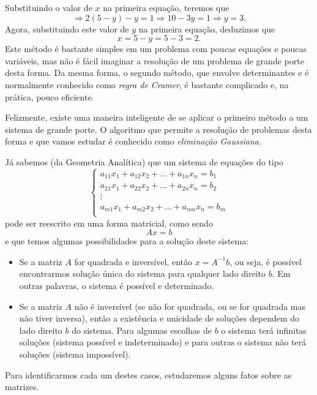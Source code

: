 Substituindo o valor de $x$ na primeira equação, teremos que
\begin{equation*}
    \Rightarrow 2(5-y)-y = 1 \Rightarrow 10 - 3y = 1 \Rightarrow y = 3.
\end{equation*}
Agora, substituindo este valor de $y$ na primeira equação, deduzimos que
\begin{equation*}
    x = 5-y = 5-3 = 2.
\end{equation*}
Este método é bastante simples em um problema com poucas equações e poucas variáveis, mas não é fácil imaginar a resolução de um problema de grande porte desta forma. Da mesma forma, o segundo método, que envolve determinantes e é normalmente conhecido como \emph{regra de Cramer}, é bastante complicado e, na prática, pouco eficiente. 

Felizmente, existe uma maneira inteligente de se aplicar o primeiro método a um sistema de grande porte. O  algoritmo que permite a resolução de problemas desta forma e que vamos estudar é conhecido como \emph{eliminação Gaussiana.}

Já sabemos (da Geometria Analítica) que um sistema de equações do tipo
\begin{equation*}
  \begin{cases}
    a_{11}x_1+a_{12}x_2+\ldots +a_{1n}x_n=b_1\\
    a_{21}x_1+a_{22}x_2+\ldots +a_{2n}x_n=b_2\\
    \vdots\\
    a_{m1}x_1+a_{m2}x_2+\ldots +a_{mn}x_n=b_m\\
  \end{cases}
\end{equation*}
pode ser reescrito em uma forma matricial, como sendo
\begin{equation}
  \label{eq:matricial}
  Ax=b
\end{equation}
e que temos algumas possibilidades para a solução deste sistema:
\begin{itemize}
  \item Se a matriz $A$ for quadrada e inversível, então $x=A^{-1}b$, ou seja, é possível encontrarmos solução única do sistema para qualquer lado direito $b$. Em outras palavras, o sistema é possível e determinado.
  \item Se a matriz $A$ não é inversível (se não for quadrada, ou se for quadrada mas não tiver inversa), então a existência e unicidade de soluções dependem do lado direito $b$ do sistema. Para algumas escolhas de $b$ o sistema terá infinitas soluções (sistema possível e indeterminado) e para outras o sistema não terá soluções (sistema impossível). 
\end{itemize}
Para identificarmos cada um destes casos, estudaremos alguns fatos sobre as matrizes.

